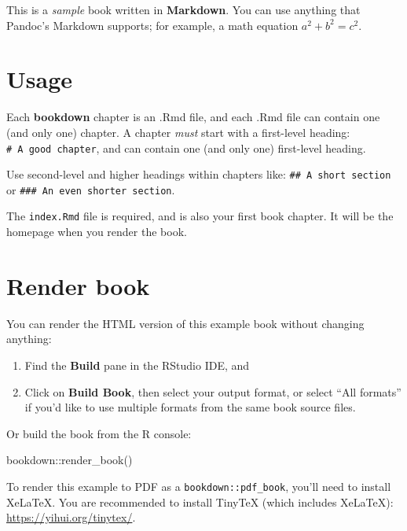 \documentclass[
]{book}
\newenvironment{Shaded}{\begin{snugshade}}{\end{snugshade}}
\newcommand{\FunctionTok}[1]{\textcolor[rgb]{0.00,0.00,0.00}{#1}}
\newcommand{\NormalTok}[1]{#1}
\newcommand{\SpecialCharTok}[1]{\textcolor[rgb]{0.00,0.00,0.00}{#1}}
\theoremstyle{definition}
\theoremstyle{definition}
\theoremstyle{definition}
\theoremstyle{definition}
\theoremstyle{remark}
\begin{document}
This is a \emph{sample} book written in \textbf{Markdown}. You can use anything that Pandoc's Markdown supports; for example, a math equation \(a^2 + b^2 = c^2\).

\hypertarget{usage}{%
\section{Usage}\label{usage}}

Each \textbf{bookdown} chapter is an .Rmd file, and each .Rmd file can contain one (and only one) chapter. A chapter \emph{must} start with a first-level heading: \texttt{\#\ A\ good\ chapter}, and can contain one (and only one) first-level heading.

Use second-level and higher headings within chapters like: \texttt{\#\#\ A\ short\ section} or \texttt{\#\#\#\ An\ even\ shorter\ section}.

The \texttt{index.Rmd} file is required, and is also your first book chapter. It will be the homepage when you render the book.

\hypertarget{render-book}{%
\section{Render book}\label{render-book}}

You can render the HTML version of this example book without changing anything:

\begin{enumerate}
\def\labelenumi{\arabic{enumi}.}
\item
  Find the \textbf{Build} pane in the RStudio IDE, and
\item
  Click on \textbf{Build Book}, then select your output format, or select ``All formats'' if you'd like to use multiple formats from the same book source files.
\end{enumerate}

Or build the book from the R console:

\begin{Shaded}
\begin{Highlighting}[]
\NormalTok{bookdown}\SpecialCharTok{::}\FunctionTok{render\_book}\NormalTok{()}
\end{Highlighting}
\end{Shaded}

To render this example to PDF as a \texttt{bookdown::pdf\_book}, you'll need to install XeLaTeX. You are recommended to install TinyTeX (which includes XeLaTeX): \url{https://yihui.org/tinytex/}.
\end{document}
